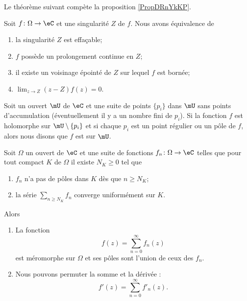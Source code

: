 Le théorème suivant compète la proposition \ref{PropDRnYkKP}.
\begin{theorem}    \label{ThoTLQOEwW}
    Soit \( f\colon \Omega\to \eC\) et une singularité \( Z\) de \( f\). Nous avons équivalence de 
    \begin{enumerate}
        \item
            la singularité \( Z\) est effaçable;
        \item
            \( f\) possède un prolongement continue en \( Z\);
        \item
            il existe un voisinage épointé de \( Z\) sur lequel \( f\) est bornée;
        \item
            \( \lim_{z\to Z}(z-Z)f(z)=0\).
    \end{enumerate}
\end{theorem}

\begin{definition}
    Soit un ouvert \( \mU\) de \( \eC\) et une suite de points \( \{ p_i \}\) dans \( \mU\) sans points d'accumulation (éventuellement il y a un nombre fini de \( p_i\)). Si la fonction \( f\) est holomorphe sur \( \mU\setminus\{ p_i \}\) et si chaque \( p_i\) est un point régulier ou un pôle de \( f\), alors nous disons que \( f\) est  sur \( \mU\).
\end{definition}

\begin{proposition} \label{PropPUZTQKl}
    Soit \( \Omega\) un ouvert de \( \eC\) et une suite de fonctions \( f_n\colon \Omega\to \eC\) telles que pour tout compact \( K\) de \( \Omega\) il existe \( N_K\geq 0\) tel que
    \begin{enumerate}
        \item
            \( f_n\) n'a pas de pôles dans \( K\) dès que \( n\geq N_K\);
        \item
            la série \( \sum_{n\geq N_K}f_n\) converge uniformément sur \( K\).
    \end{enumerate}
    Alors
    \begin{enumerate}
        \item
            La fonction 
            \begin{equation}
                f(z)=\sum_{n=0}^{\infty}f_n(z)
            \end{equation}
            est méromorphe sur \( \Omega\) et ses pôles sont l'union de ceux des \( f_n\).
        \item
            Nous pouvons permuter la somme et la dérivée :
            \begin{equation}
                f'(z)=\sum_{n=0}^{\infty}f'_n(z).   
            \end{equation}
    \end{enumerate}
\end{proposition}

